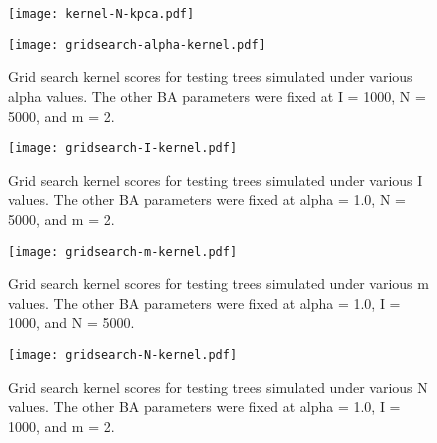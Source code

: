 \begin{figure}
  \centering
  \texttt{[image: kernel-N-kpca.pdf]}
  \label{fig:Nkpca}
\end{figure}

\begin{figure}
  \centering
  \texttt{[image: gridsearch-alpha-kernel.pdf]}
  \caption{                                              
    Grid search kernel scores for testing trees simulated under various             
    \gls{alpha} values. The other \gls{BA} parameters were fixed at \gls{I} =
    1000, \gls{N} = 5000, and \gls{m} = 2. 
  }        
  \label{fig:gridalpha}
\end{figure}

\begin{figure}
  \centering
  \texttt{[image: gridsearch-I-kernel.pdf]}
  \caption{                                              
    Grid search kernel scores for testing trees simulated under various             
    \gls{I} values. The other \gls{BA} parameters were fixed at \gls{alpha} =
    1.0, \gls{N} = 5000, and \gls{m} = 2. 
  }        
  \label{fig:gridI}
\end{figure}

\begin{figure}
  \centering
  \texttt{[image: gridsearch-m-kernel.pdf]}
  \caption{                                              
    Grid search kernel scores for testing trees simulated under various             
    \gls{m} values. The other \gls{BA} parameters were fixed at \gls{alpha} =
    1.0, \gls{I} = 1000, and \gls{N} = 5000.
  }        
  \label{fig:gridm}
\end{figure}

\begin{figure}
  \centering
  \texttt{[image: gridsearch-N-kernel.pdf]}
  \caption{                                              
    Grid search kernel scores for testing trees simulated under various             
    \gls{N} values. The other \gls{BA} parameters were fixed at \gls{alpha} =
    1.0, \gls{I} = 1000, and \gls{m} = 2. 
  }        
  \label{fig:gridN}
\end{figure}
